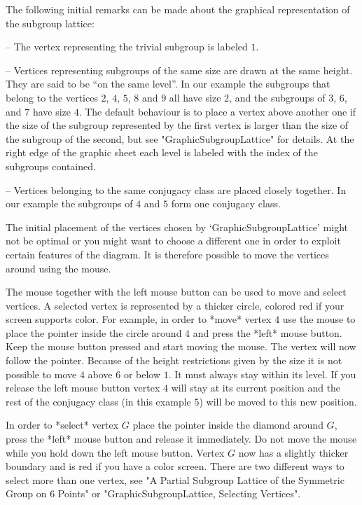 The   following initial  remarks  can    be  made  about  the   graphical
representation of the subgroup lattice:

\beginlist
\item{--} The vertex representing the trivial subgroup is labeled $1$.
  
\item{--} Vertices representing subgroups of the same size are drawn at the
  same height. They are said to be ``on the same level''.  In our example
  the subgroups that belong to the vertices $2$, $4$, $5$, $8$ and $9$ all
  have size 2, and the subgroups of $3$, $6$, and $7$ have size $4$. The
  default behaviour is to place a vertex above another one if the size of
  the subgroup represented by the first vertex is larger than the size of
  the subgroup of the second, but see "GraphicSubgroupLattice" for details. At
  the right edge of the graphic sheet each level is labeled with the index
  of the subgroups contained.
  
\item{--} Vertices belonging to the same conjugacy class are placed closely
  together.  In our example the subgroups of $4$ and $5$ form one conjugacy
  class.
\endlist

The initial placement of the vertices chosen by `GraphicSubgroupLattice'
might not be optimal or you might want to choose a different one in order
to exploit certain features of the diagram.  It is therefore possible to
move the vertices around using the mouse.

The mouse together with the left mouse button can be used to move and
select vertices. A selected vertex is represented by a thicker circle,
colored red if your screen supports color.  For example, in order to *move*
vertex $4$ use the mouse to place the pointer inside the circle around $4$
and press the *left* mouse button.  Keep the mouse button pressed and start
moving the mouse.  The vertex will now follow the pointer.  Because of the
height restrictions given by the size it is not possible to move $4$ above
$6$ or below $1$. It must always stay within its level. If you release the
left mouse button vertex $4$ will stay at its current position and the rest
of the conjugacy class (in this example $5$) will be moved to this new
position.

In  order to *select* vertex $G$  place the pointer inside the diamond
around $G$, press the *left* mouse button  and release it immediately. 
Do  not move the  mouse  while you hold down  the  left mouse button.  
Vertex $G$ now has a slightly thicker boundary and is  red if you have
a color screen.  There are two different ways  to select more than one
vertex,  see "A Partial  Subgroup Lattice of  the Symmetric Group on 6
Points" or "GraphicSubgroupLattice, Selecting Vertices".


